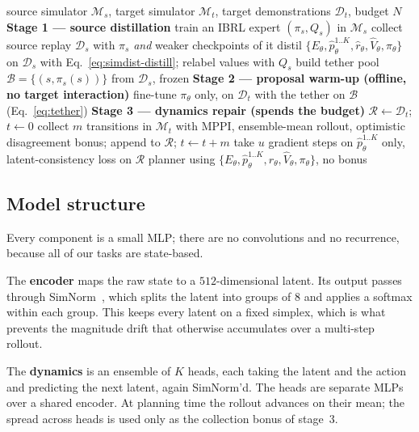 \begin{algorithm}[h]
\caption{SimADEPT}
\label{alg:simoaed}
\begin{algorithmic}[1]
\Require source simulator $\mathcal{M}_s$, target simulator $\mathcal{M}_t$,
         target demonstrations $\mathcal{D}_t$, budget $N$
\Statex \textbf{Stage 1 --- source distillation}
\State train an IBRL expert $(\pi_s, Q_s)$ in $\mathcal{M}_s$
\State collect source replay $\mathcal{D}_s$ with $\pi_s$ \emph{and} weaker checkpoints of it
\State distil $\{E_\theta, \hat p_\theta^{1..K}, \hat r_\theta, \hat V_\theta, \pi_\theta\}$
       on $\mathcal{D}_s$ with Eq.~\ref{eq:simdist-distill}; relabel values with $Q_s$
\State build tether pool $\mathcal{B} = \{(s, \pi_s(s))\}$ from $\mathcal{D}_s$, frozen
\Statex \textbf{Stage 2 --- proposal warm-up (offline, no target interaction)}
\State fine-tune $\pi_\theta$ only, on $\mathcal{D}_t$ with the tether on $\mathcal{B}$ (Eq.~\ref{eq:tether})
\Statex \textbf{Stage 3 --- dynamics repair (spends the budget)}
\State $\mathcal{R} \gets \mathcal{D}_t$; \; $t \gets 0$
  \State collect $m$ transitions in $\mathcal{M}_t$ with MPPI, ensemble-mean rollout,
         optimistic disagreement bonus; append to $\mathcal{R}$; \; $t \gets t + m$
  \State take $u$ gradient steps on $\hat p_\theta^{1..K}$ only, latent-consistency
         loss on $\mathcal{R}$ 
\EndWhile
\State \Return planner using $\{E_\theta, \hat p_\theta^{1..K}, \hat r_\theta, \hat V_\theta, \pi_\theta\}$, no bonus
\end{algorithmic}
\end{algorithm}

\subsection{Model structure}
\label{app:model}

Every component is a small MLP; there are no convolutions and no recurrence,
because all of our tasks are state-based.

The \textbf{encoder} maps the raw state to a $512$-dimensional latent. Its output
passes through SimNorm~\citep{hansen2024tdmpc2}, which splits the latent into
groups of $8$ and applies a softmax within each group. This keeps every latent on
a fixed simplex, which is what prevents the magnitude drift that otherwise
accumulates over a multi-step rollout.

The \textbf{dynamics} is an ensemble of $K$ heads, each taking the latent and the
action and predicting the next latent, again SimNorm'd. The heads are separate
MLPs over a shared encoder. At planning time the rollout advances on their mean;
the spread across heads is used only as the collection bonus of stage~3.

